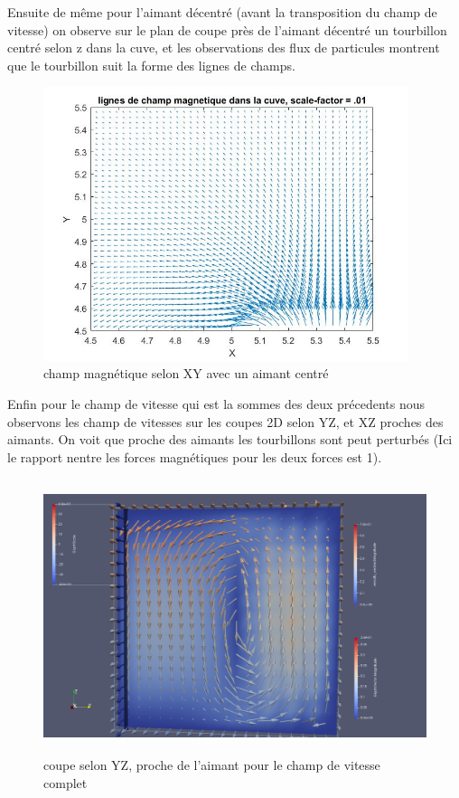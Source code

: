 \documentclass[a4paper,12pt,titlepage]{report}
\begin{document}
\begin{onehalfspace}
Ensuite de même pour l'aimant décentré (avant la transposition du champ de vitesse) on observe
sur le plan de coupe près de l'aimant décentré un tourbillon centré selon z dans la cuve, et les observations des flux de particules montrent que le tourbillon suit la forme des lignes de champs. \\



\begin{figure}[!h]
\begin{center}
\includegraphics[height = 8cm, keepaspectratio]{graphes/coupe_2D_champ_decentre.jpg} 
\caption{\label{figure 39 } champ magnétique selon XY avec un aimant centré}
\end{center}
\end{figure}

\newpage
Enfin pour le champ de vitesse qui est la sommes des deux précedents nous observons les champ de vitesses sur les coupes 2D selon YZ, et XZ proches des aimants.  On voit que proche des aimants les tourbillons sont peut perturbés (Ici le rapport nentre les forces magnétiques pour les deux forces est 1).
\newpage
\begin{figure}[!h]
\center 
\includegraphics[height = 8cm, keepaspectratio]{graphes/Paraview/total_coupe_pret_aimant_decentre.png} 
\caption{\label{figure 322 } coupe selon YZ, proche de l'aimant pour le champ de vitesse complet}
\end{figure}


\end{onehalfspace}
\end{document}
